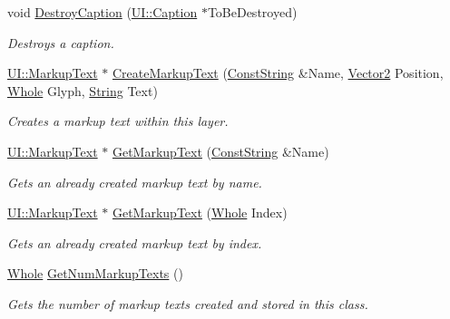 \begin{DoxyCompactItemize}
void \hyperlink{classphys_1_1UILayer_a5c0ac9bd2b2c41178ccde42812e39210}{DestroyCaption} (\hyperlink{classphys_1_1UI_1_1Caption}{UI::Caption} $\ast$ToBeDestroyed)
\begin{DoxyCompactList}\small\item\em Destroys a caption. \item\end{DoxyCompactList}\item 
\hyperlink{classphys_1_1UI_1_1MarkupText}{UI::MarkupText} $\ast$ \hyperlink{classphys_1_1UILayer_ac3f8812430c9b4f04cae996297e59377}{CreateMarkupText} (\hyperlink{namespacephys_a5ce5049f8b4bf88d6413c47b504ebb31}{ConstString} \&Name, \hyperlink{classphys_1_1Vector2}{Vector2} Position, \hyperlink{namespacephys_a460f6bc24c8dd347b05e0366ae34f34a}{Whole} Glyph, \hyperlink{namespacephys_aa03900411993de7fbfec4789bc1d392e}{String} Text)
\begin{DoxyCompactList}\small\item\em Creates a markup text within this layer. \item\end{DoxyCompactList}\item 
\hyperlink{classphys_1_1UI_1_1MarkupText}{UI::MarkupText} $\ast$ \hyperlink{classphys_1_1UILayer_abadb760dd330e6963e27ad725d44ce74}{GetMarkupText} (\hyperlink{namespacephys_a5ce5049f8b4bf88d6413c47b504ebb31}{ConstString} \&Name)
\begin{DoxyCompactList}\small\item\em Gets an already created markup text by name. \item\end{DoxyCompactList}\item 
\hyperlink{classphys_1_1UI_1_1MarkupText}{UI::MarkupText} $\ast$ \hyperlink{classphys_1_1UILayer_a2f40efc62324c5d2d5c1282f2ea6088d}{GetMarkupText} (\hyperlink{namespacephys_a460f6bc24c8dd347b05e0366ae34f34a}{Whole} Index)
\begin{DoxyCompactList}\small\item\em Gets an already created markup text by index. \item\end{DoxyCompactList}\item 
\hyperlink{namespacephys_a460f6bc24c8dd347b05e0366ae34f34a}{Whole} \hyperlink{classphys_1_1UILayer_a80f4761638d701d8767ad1c0f769985a}{GetNumMarkupTexts} ()
\begin{DoxyCompactList}\small\item\em Gets the number of markup texts created and stored in this class. \item\end{DoxyCompactList}\item 

\end{DoxyCompactItemize}

